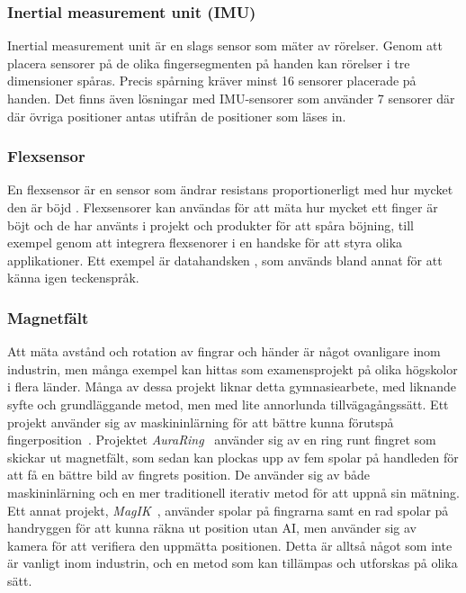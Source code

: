 \documentclass[a4paper]{article}
\begin{document}
\begin{sloppypar}
    \subsubsection{Inertial measurement unit (IMU)}
    Inertial measurement unit är en slags sensor som mäter av rörelser. Genom att
    placera sensorer på de olika fingersegmenten på handen kan rörelser i tre
    dimensioner spåras. Precis spårning kräver minst 16 sensorer placerade på
    handen. Det finns även lösningar med IMU-sensorer som använder 7 sensorer
    där där övriga positioner antas utifrån de positioner som läses in.\cite{wiki:Finger_tracking}

    \subsubsection{Flexsensor}
    En flexsensor är en sensor som ändrar resistans proportionerligt med hur mycket den är böjd \cite{wiki:Flex_sensor}.
    Flexsensorer kan användas för att mäta hur mycket ett finger är böjt och de har använts i projekt och produkter för att spåra böjning, till exempel genom att integrera flexsenorer i en handske för att styra olika applikationer. Ett exempel är datahandsken \cite{wiki:Wired_glove}, som används bland annat för att känna igen teckenspråk.

    \subsubsection{Magnetfält}
    Att mäta avstånd och rotation av fingrar och händer är något ovanligare inom industrin, men många exempel kan hittas som examensprojekt på olika högskolor i flera länder.
    Många av dessa projekt liknar detta gymnasiearbete, med liknande syfte och grundläggande metod, men med lite annorlunda tillvägagångssätt.
    Ett projekt använder sig av maskininlärning för att bättre kunna förutspå fingerposition~\cite{article:sci-rep-mag-ind}.
    Projektet \textit{AuraRing}~\cite{article:AuraRing} använder sig av en ring runt fingret som skickar ut magnetfält, som sedan kan plockas upp av fem spolar på handleden för att få en bättre bild av fingrets position.
    De använder sig av både maskininlärning och en mer traditionell iterativ metod för att uppnå sin mätning.
    Ett annat projekt, \textit{MagIK}~\cite{article:MagIK}, använder spolar på fingrarna samt en rad spolar på handryggen för att kunna räkna ut position utan AI, men använder sig av kamera för att verifiera den uppmätta positionen.
    Detta är alltså något som inte är vanligt inom industrin, och en metod som kan tillämpas och utforskas på olika sätt.



\end{sloppypar}
\end{document}
